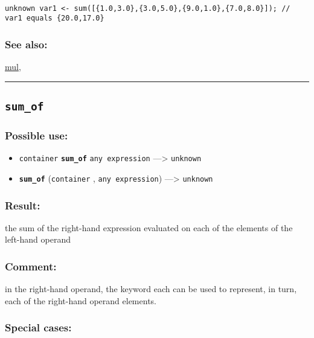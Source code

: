 \documentclass[]{book}
\providecommand{\tightlist}{%
  \setlength{\itemsep}{0pt}\setlength{\parskip}{0pt}}
\theoremstyle{definition}
\theoremstyle{definition}
\theoremstyle{definition}
\theoremstyle{remark}
\begin{document}
\begin{verbatim}
 
unknown var1 <- sum([{1.0,3.0},{3.0,5.0},{9.0,1.0},{7.0,8.0}]); // var1 equals {20.0,17.0}
\end{verbatim}

\subsubsection{See also:}\label{see-also-199}

\href{OperatorsIM\#mul}{mul},

\begin{center}\rule{0.5\linewidth}{\linethickness}\end{center}

\subsection{\texorpdfstring{\texttt{sum\_of}}{sum\_of}}\label{sum_of}

\subsubsection{Possible use:}\label{possible-use-510}

\begin{itemize}
\tightlist
\item
  \texttt{container} \textbf{\texttt{sum\_of}} \texttt{any\ expression}
  ---\textgreater{} \texttt{unknown}
\item
  \textbf{\texttt{sum\_of}} (\texttt{container} ,
  \texttt{any\ expression}) ---\textgreater{} \texttt{unknown}
\end{itemize}

\subsubsection{Result:}\label{result-493}

the sum of the right-hand expression evaluated on each of the elements
of the left-hand operand

\subsubsection{Comment:}\label{comment-97}

in the right-hand operand, the keyword each can be used to represent, in
turn, each of the right-hand operand elements.

\subsubsection{Special cases:}\label{special-cases-133}
\end{document}
